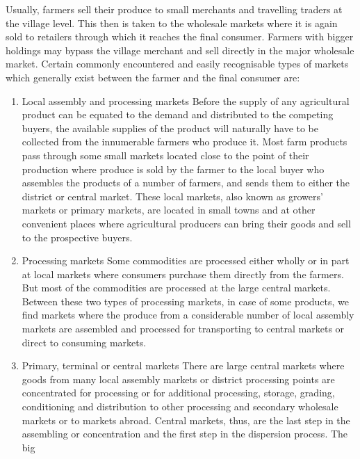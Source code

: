 \documentclass[11pt,]{book}
\theoremstyle{definition}
\theoremstyle{definition}
\theoremstyle{definition}
\theoremstyle{remark}
\begin{document}
Usually, farmers sell their produce to small merchants and travelling
traders at the village level. This then is taken to the wholesale
markets where it is again sold to retailers through which it reaches the
final consumer. Farmers with bigger holdings may bypass the village
merchant and sell directly in the major wholesale market. Certain
commonly encountered and easily recognisable types of markets which
generally exist between the farmer and the final consumer are:

\begin{enumerate}
\def\labelenumi{\arabic{enumi}.}
\item
  Local assembly and processing markets \newline Before the supply of
  any agricultural product can be equated to the demand and distributed
  to the competing buyers, the available supplies of the product will
  naturally have to be collected from the innumerable farmers who
  produce it. Most farm products pass through some small markets located
  close to the point of their production where produce is sold by the
  farmer to the local buyer who assembles the products of a number of
  farmers, and sends them to either the district or central market.
  These local markets, also known as growers' markets or primary
  markets, are located in small towns and at other convenient places
  where agricultural producers can bring their goods and sell to the
  prospective buyers.
\item
  Processing markets \newline Some commodities are processed either
  wholly or in part at local markets where consumers purchase them
  directly from the farmers. But most of the commodities are processed
  at the large central markets. Between these two types of processing
  markets, in case of some products, we find markets where the produce
  from a considerable number of local assembly markets are assembled and
  processed for transporting to central markets or direct to consuming
  markets.
\item
  Primary, terminal or central markets \newline There are large central
  markets where goods from many local assembly markets or district
  processing points are concentrated for processing or for additional
  processing, storage, grading, conditioning and distribution to other
  processing and secondary wholesale markets or to markets abroad.
  Central markets, thus, are the last step in the assembling or
  concentration and the first step in the dispersion process. The big

\end{enumerate}
\end{document}
